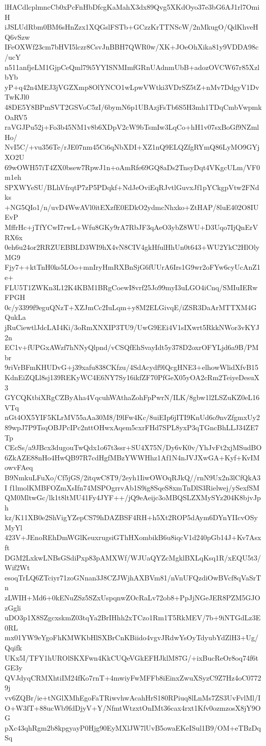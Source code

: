 lHACdlcplmncCb0xPcFnHbDfcgKaMahX3dx89Qvg5XKdOyo37e3bG6AJ1rl7OmiH
iJSLUdRbm0BM6sHnZzx1XQGslFSTb+GCzzKrTTNScW/2nMkugO/QdKhveHQ6vSzw
IFeOXWf23cm7bHVI5lczr8CsvJnBBH7QWR0w/XK+JOeOhXika81y9VDDA98c/ucY
n511anfjeLM1GjpCeQml79i5YYISNMImfGRnUAdnmUbB+adozOVCW67r85XzlbYb
yP+q42n4MEJ3jVGZXmp8OlYNCO1wLpwVWtki3VDrSZ5tZ+nMv7DdgyV1DvTwKJl0
48DE5Y8BPmSVT2GSVoC5zI/6bymN6p1UBAzjFsTb6S5H3mh1TDqCmbVwpmkOaRV5
raVGJPu52j+Fo3b45NM1v8b6XDpV2cW9bTsmIw3LqCo+hH1v07sxBoGf9NZmlHo/
NvI5C/+vu356Te/rJE07nm45Ci6qNbXDI+XZ1nQ9ELQZfgRYmQ86LyMO9GYjXO2U
69wOWH57iT4ZX0bsew7RpwJ1n+oAmRfe69GQ8aDs2TnsyDqt4VKgcULm/VF0m1eh
SPXWYeSU/BLhVfrqtP7zP5PDqkf+NdJeOviEqRJvtlGuvxJf1pYCkgpVtw2FNdks
+NG5QIo1/n/uvD4WwAVl0itEXzfE0EDkO2ydmcNhxko+ZtHAP/8luE402O8IUEvP
MffrHc+jTfYCwI7rwL+Wfu8GKy9rA7RbJF3qAeO3ybZ8WU+D3Uqo7IjQnErVRX6x
0eh6u24or2RRZUEBBLD3WI9hX4vN8CIV4gkHfulHhUn0t643+WU2YkC2HlOlyMG9
Fjy7++ktTnH0ks5LOo+mnIryHmRXBnSjG6fUUrA6Irs1G9wr2oFYw6cyUcAnZ1e+
FLU5T1ZWKn3L12K4KBM1BRgCoewI8vrf25Jo99myI3uLGO4iCnq/SMIuIERwFPGH
0c/y3399f9eguQNzT+XZJmCc2IuLqm+y8M2ELGivqE/iZSR3DaArMTTXM4GQukLa
jRuCiewtlJdcLAI4Ki/3oRmXNXIP3TU9/UwG9EEi4V1sIXwrt5RkkNWor3vKYJ2n
EC1v+fUPGxAWzf7hNNyQlpnd/vCSQfEhSvayIdt5y378D2oxrOFYLjd6a9B/PMbr
9riVrBFmKHUDvG+j39xafu838CKfzu/4SdAcydf9lQcgHNE3+elhowWlidXfvB15
KdnEiZQLl8sj139REKyWC4E6NY7Sy16ikfZF70PfGeX05yOA2cRm2TeiyeDesuX3
GYCQKtbiXRgCZByAha4VqcuhWAthaZohFpPwrN/ILK/8gbw1l2LSZuKZ0eL16VTq
nGt4OX5YIF5KLrMV55aAa30M8/I9lFw4Kc/8uiEIp6jITI9KnUd6o9nvZfgmxUy2
89wpJ7P9TsqOBJPcIPc2nttOHwxAqem5cxrFHd7SPL8yxP3qTGncBhLLJ34ZE7Tp
CEcSs/a9JBcx3dugouTwQdx1o67t3ssr+SU4X75N/Dy6vK0v/YhJvFt2xjMSudBO
6ZkAZE88nHo4HwQB97R7cdHgfMBzYWWHhz1Af1N4nJVJXwGA+Kyf+KvIMowvFAeq
B9NmkuLFuXo/Cf5jGS/2itqwC8T9/2eyh1IiwOWOqRJkQ//rnN9Ux2n3lCfQkA3I
f1lmolKMBFOZmXsIfn74MSPOgrrvAb1S9ig8SqeS8xmTnDlS3Rielwej/ySexfSM
QM0MltwGc/lk1t8ltMU41Fy4JYF++/jQ9eAeijc3oMBQSLZXMySYz204K8bjvJph
kz/K11XB0e2ShVigYZepCS79hDAZBSF4RH+h5Xt2ROP5dAym6DYnYIIcvOSyMyYl
423V+JEnoREhDmWGlKeuxrugsiGThHXombikB6u8iqcV1d240pGb14J+Kv7Asxft
DGM2LxkwLNBsGSdiPxp83pAMXWf/WJUaQYZcMgklBXLqKsq1R/xEQU5t3/Wif2Wt
esoqTrLQ6ZTciyr71zoGNnan3J8CZJWjhAXBVm81/nVnUFQzdiOwBVcf8qVaSrTn
zLWIH+Md6+0kENuZSz5SZxUspqnwZOcRaLv72ob8+PpJjNGeJER8PZM5GJOzGgli
uDO3p1X8SZgcxskmZ03tqYa2BrIHhh2xTCzo1Rm1T5RkMEV/7b+9iNTGdLz3E0RL
mx01YW9eYgoFhKMWKbHlSXBrCnKBiido4vgvJRdwYsOyTdyubYdZlH3+Ug/Qqifk
UKx5I/TFY1hUROlSKXFwn4KkCUQeVGkEFHJklM87G/+ixBucReOr8oq74f6tGE3y
QVJdyqCRMXhtiIM24fKo7rnT+4mwiyFwMFFb8iEinxZwuXSyzC9Z7Hz4oC07729j
vv6ZQBr/ie+tNGlXMhEgoFaTRiwvhwAcahHrS180RPiuq8lLnMs7ZS3UvFvlMl/I
O+W3fT+88ucWb9fdDjyV+Y/NfmtWtzxtOnIMt36cax4rxt1Kfv0ozmzosX8jY9OG
pXc43qhRgm2b8kpgyayP0Hjg90EyMXlJW7lUvB5owaEKeISul1B9/OM+eTBzDqSq
